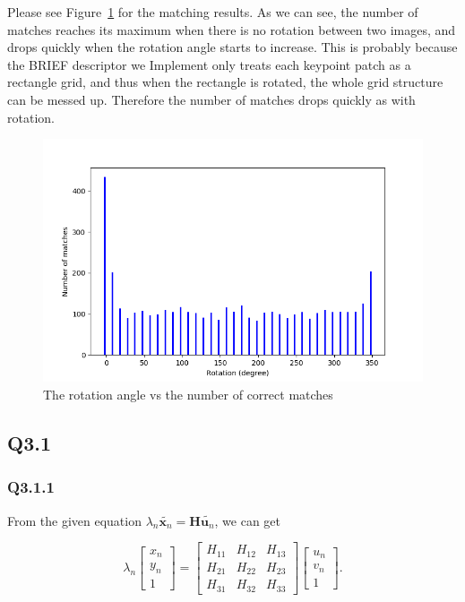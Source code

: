 \documentclass[11pt]{article}
\begin{document}
Please see Figure~\ref{fig:q2.5} for the matching results. As we can see, the number of matches reaches its maximum when there is no rotation between two images, and drops quickly when the rotation angle starts to increase. This is probably because the BRIEF descriptor we Implement only treats each keypoint patch as a rectangle grid, and thus when the rectangle is rotated, the whole grid structure can be messed up. Therefore the number of matches drops quickly as with rotation.

\begin{figure}[h!]
    \centering
    \includegraphics[width=.8\linewidth]{../results/q2_5.png}
    \caption{The rotation angle vs the number of correct matches}
    \label{fig:q2.5}
\end{figure}

\newpage

\subsection*{Q3.1}

\subsubsection*{Q3.1.1}

\newcommand{\vecxn}{\tilde{\mathbf{x}_n}}
\newcommand{\vecun}{\tilde{\mathbf{u}_n}}

From the given equation $\lambda_n \vecxn = \mathbf{H} \vecun$, we can get

\begin{equation}
    \lambda_n
    \begin{bmatrix}
        x_{n} \\ y_{n} \\ 1
    \end{bmatrix}
    =
    \begin{bmatrix}
        H_{11} & H_{12} & H_{13} \\
        H_{21} & H_{22} & H_{23} \\
        H_{31} & H_{32} & H_{33}
    \end{bmatrix}
    \begin{bmatrix}
        u_{n} \\ v_{n} \\ 1
    \end{bmatrix}.
\end{equation}
\end{document}
